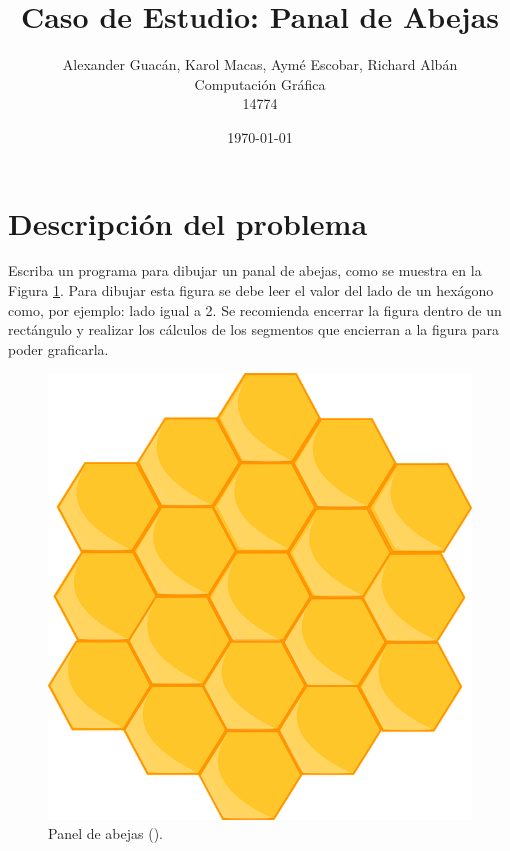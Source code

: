 \documentclass[oneside, a4paper]{article}
\title{Caso de Estudio: Panal de Abejas}
\author{
    Alexander Guacán, Karol Macas, Aymé Escobar, Richard Albán\\
    Computación Gráfica\\
    14774
}
\date{\today}
\begin{document}
    \pagestyle{fancy}

    \begin{titlepage}
        \maketitle
    \end{titlepage}

    \section{Descripción del problema}
        Escriba un programa para dibujar un panal de abejas, como se muestra en la Figura \ref{fig:bee_panel_example}. Para dibujar esta figura se debe leer el valor del lado de un hexágono como, por ejemplo: lado igual a 2. Se recomienda encerrar la figura dentro de un rectángulo y realizar los cálculos de los segmentos que encierran a la figura para poder graficarla.

        \begin{figure}[H]
            \centering
            \includegraphics[scale=0.2]{bee_panel_example.png}
            \caption{Panel de abejas (\cite{bee_panel_example}).}
            \label{fig:bee_panel_example}
        \end{figure}
\end{document}
